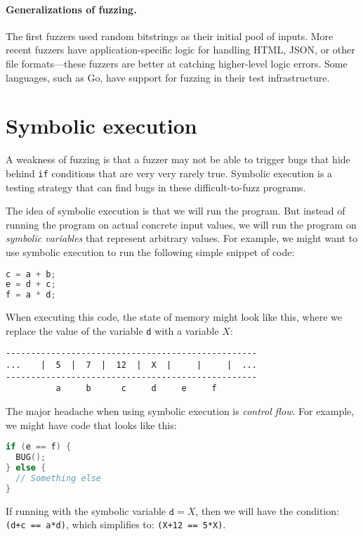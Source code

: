 \paragraph{Generalizations of fuzzing.}
The first fuzzers used random bitstrings as their initial pool of inputs.
More recent fuzzers have application-specific logic for handling 
HTML, JSON, or other file formats---these fuzzers are better at
catching higher-level logic errors.
Some languages, such as Go, have support for fuzzing in their
test infrastructure.

\section{Symbolic execution}

A weakness of fuzzing is that a fuzzer may not be able to trigger bugs that
hide behind \texttt{if} conditions that are very very rarely true.
Symbolic execution is a testing strategy that can find bugs in these
difficult-to-fuzz programs.

The idea of symbolic execution is that we will run the program. But instead
of running the program on actual concrete input values, we will run
the program on \emph{symbolic variables} that represent arbitrary values.
For example, we might want to use symbolic execution to run the following
simple snippet of code:
\begin{lstlisting}[language=c]
c = a + b;
e = d + c;
f = a * d;
\end{lstlisting}

When executing this code, the state of memory might look like this,
where we replace the value of the variable \texttt{d} with a variable $X$:
\begin{verbatim}
--------------------------------------------------
...    |  5  |  7  |  12  |  X  |     |     |  ... 
--------------------------------------------------
          a     b      c     d     e     f
\end{verbatim}

The major headache when using symbolic execution is \emph{control flow}.
For example, we might have code that looks like this:
\begin{lstlisting}[language=c]
if (e == f) {
  BUG();
} else {
  // Something else
}
\end{lstlisting}
If running with the symbolic variable $\texttt{d} = X$, then 
we will have the condition:
\verb|(d+c == a*d)|, which simplifies to:
\verb|(X+12 == 5*X)|.


